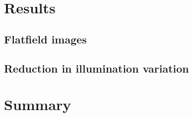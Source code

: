 \documentclass[letterpaper,11pt]{article}
\begin{document}
\section{Results}
\label{sec:results}

\subsection{Flatfield images}
\label{ssec:flatfield_images}

\subsection{Reduction in illumination variation}
\label{ssec:reduction_in_illumination_variation}

\section{Summary}
\label{sec:summary}


\end{document}
